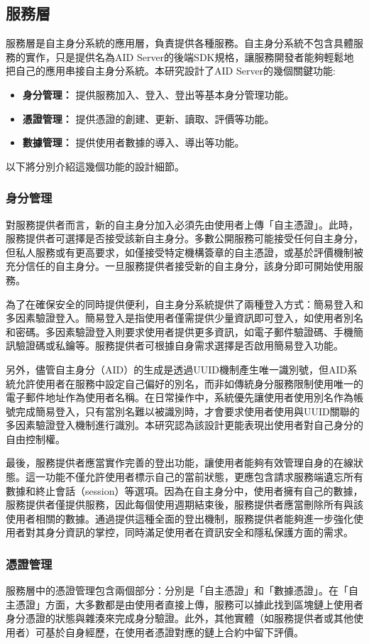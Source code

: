 \subsection{服務層}
服務層是自主身分系統的應用層，負責提供各種服務。自主身分系統不包含具體服務的實作，只是提供名為AID Server的後端SDK規格，讓服務開發者能夠輕鬆地把自己的應用串接自主身分系統。本研究設計了AID Server的幾個關鍵功能:
\begin{itemize}
  \item \textbf{身分管理：} 提供服務加入、登入、登出等基本身分管理功能。
  \item \textbf{憑證管理：} 提供憑證的創建、更新、讀取、評價等功能。
  \item \textbf{數據管理：} 提供使用者數據的導入、導出等功能。
\end{itemize}
以下將分別介紹這幾個功能的設計細節。
\subsubsection{身分管理}
對服務提供者而言，新的自主身分加入必須先由使用者上傳「自主憑證」。此時，服務提供者可選擇是否接受該新自主身分。多數公開服務可能接受任何自主身分，但私人服務或有更高要求，如僅接受特定機構簽章的自主憑證，或基於評價機制被充分信任的自主身分。一旦服務提供者接受新的自主身分，該身分即可開始使用服務。

為了在確保安全的同時提供便利，自主身分系統提供了兩種登入方式：簡易登入和多因素驗證登入。簡易登入是指使用者僅需提供少量資訊即可登入，如使用者別名和密碼。多因素驗證登入則要求使用者提供更多資訊，如電子郵件驗證碼、手機簡訊驗證碼或私鑰等。服務提供者可根據自身需求選擇是否啟用簡易登入功能。

另外，儘管自主身分（AID）的生成是透過UUID機制\cite{uuid}產生唯一識別號，但AID系統允許使用者在服務中設定自己偏好的別名，而非如傳統身分服務限制使用唯一的電子郵件地址作為使用者名稱。在日常操作中，系統優先讓使用者使用別名作為帳號完成簡易登入，只有當別名難以被識別時，才會要求使用者使用與UUID關聯的多因素驗證登入機制進行識別。本研究認為該設計更能表現出使用者對自己身分的自由控制權。

最後，服務提供者應當實作完善的登出功能，讓使用者能夠有效管理自身的在線狀態。這一功能不僅允許使用者標示自己的當前狀態，更應包含請求服務端遺忘所有數據和終止會話（session）等選項。因為在自主身分中，使用者擁有自己的數據，服務提供者僅提供服務，因此每個使用週期結束後，服務提供者應當刪除所有與該使用者相關的數據。通過提供這種全面的登出機制，服務提供者能夠進一步強化使用者對其身分資訊的掌控，同時滿足使用者在資訊安全和隱私保護方面的需求。
\subsubsection{憑證管理}
服務層中的憑證管理包含兩個部分：分別是「自主憑證」和「數據憑證」。在「自主憑證」方面，大多數都是由使用者直接上傳，服務可以據此找到區塊鏈上使用者身分憑證的狀態與雜湊來完成身分驗證。此外，其他實體（如服務提供者或其他使用者）可基於自身經歷，在使用者憑證對應的鏈上合約中留下評價。


